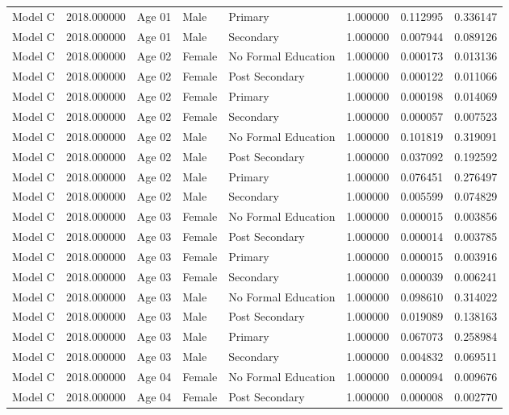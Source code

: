 \begin{table}[ht]
\begin{tabular}{lrlllrrr}
Model C & 2018.000000 & Age 01 & Male & Primary & 1.000000 & 0.112995 & 0.336147 \\
Model C & 2018.000000 & Age 01 & Male & Secondary & 1.000000 & 0.007944 & 0.089126 \\
Model C & 2018.000000 & Age 02 & Female & No Formal Education & 1.000000 & 0.000173 & 0.013136 \\
Model C & 2018.000000 & Age 02 & Female & Post Secondary & 1.000000 & 0.000122 & 0.011066 \\
Model C & 2018.000000 & Age 02 & Female & Primary & 1.000000 & 0.000198 & 0.014069 \\
Model C & 2018.000000 & Age 02 & Female & Secondary & 1.000000 & 0.000057 & 0.007523 \\
Model C & 2018.000000 & Age 02 & Male & No Formal Education & 1.000000 & 0.101819 & 0.319091 \\
Model C & 2018.000000 & Age 02 & Male & Post Secondary & 1.000000 & 0.037092 & 0.192592 \\
Model C & 2018.000000 & Age 02 & Male & Primary & 1.000000 & 0.076451 & 0.276497 \\
Model C & 2018.000000 & Age 02 & Male & Secondary & 1.000000 & 0.005599 & 0.074829 \\
Model C & 2018.000000 & Age 03 & Female & No Formal Education & 1.000000 & 0.000015 & 0.003856 \\
Model C & 2018.000000 & Age 03 & Female & Post Secondary & 1.000000 & 0.000014 & 0.003785 \\
Model C & 2018.000000 & Age 03 & Female & Primary & 1.000000 & 0.000015 & 0.003916 \\
Model C & 2018.000000 & Age 03 & Female & Secondary & 1.000000 & 0.000039 & 0.006241 \\
Model C & 2018.000000 & Age 03 & Male & No Formal Education & 1.000000 & 0.098610 & 0.314022 \\
Model C & 2018.000000 & Age 03 & Male & Post Secondary & 1.000000 & 0.019089 & 0.138163 \\
Model C & 2018.000000 & Age 03 & Male & Primary & 1.000000 & 0.067073 & 0.258984 \\
Model C & 2018.000000 & Age 03 & Male & Secondary & 1.000000 & 0.004832 & 0.069511 \\
Model C & 2018.000000 & Age 04 & Female & No Formal Education & 1.000000 & 0.000094 & 0.009676 \\
Model C & 2018.000000 & Age 04 & Female & Post Secondary & 1.000000 & 0.000008 & 0.002770 \\

\end{tabular}
\end{table}
